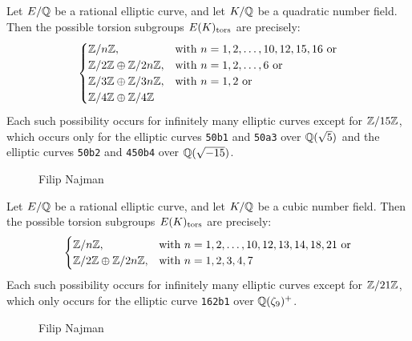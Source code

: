 \begin{frame}[plain]
\footnotesize
\begin{thm}[Najman, 2015]
Let $E/\mathbb{Q}$ be a rational elliptic curve, and let $K/\mathbb{Q}$ be a quadratic number field. Then the possible torsion subgroups $E(K)_{\text{tors}}$ are precisely:
	\[
	\begin{cases}
	\mathbb{Z}/n\mathbb{Z}, & \text{with } n= 1, 2, \ldots, 10, 12, 15, 16 \text{ or} \\
	\mathbb{Z}/2\mathbb{Z} \oplus \mathbb{Z}/2n\mathbb{Z}, & \text{with } n= 1, 2, \ldots, 6 \text{ or} \\
	\mathbb{Z}/3\mathbb{Z} \oplus \mathbb{Z}/3n\mathbb{Z}, & \text{with } n= 1, 2 \text{ or} \\
	\mathbb{Z}/4\mathbb{Z} \oplus \mathbb{Z}/4\mathbb{Z}
	\end{cases}
	\]
Each such possibility occurs for infinitely many elliptic curves except for $\mathbb{Z}/15\mathbb{Z}$, which occurs only for the elliptic curves \texttt{50b1} and \texttt{50a3} over $\mathbb{Q}(\sqrt{5})$ and the elliptic curves \texttt{50b2} and \texttt{450b4} over $\mathbb{Q}(\sqrt{-15})$. 
\end{thm}
	\begin{figure}[!ht]
	\centering
	\captionsetup{labelformat=empty}
	\caption{Filip Najman}
	\end{figure}
\end{frame}



\begin{frame}[plain]
\begin{thm}[Najman, 2015]
Let $E/\mathbb{Q}$ be a rational elliptic curve, and let $K/\mathbb{Q}$ be a cubic number field. Then the possible torsion subgroups $E(K)_{\text{tors}}$ are precisely:
	\[
	\begin{cases}
	\mathbb{Z}/n\mathbb{Z}, & \text{with } n= 1, 2, \ldots, 10, 12, 13, 14, 18, 21 \text{ or} \\
	\mathbb{Z}/2\mathbb{Z} \oplus \mathbb{Z}/2n\mathbb{Z}, & \text{with } n= 1, 2, 3, 4, 7
	\end{cases}
	\]
Each such possibility occurs for infinitely many elliptic curves except for $\mathbb{Z}/21\mathbb{Z}$, which only occurs for the elliptic curve \texttt{162b1} over $\mathbb{Q}(\zeta_9)^+$.
\end{thm}
	\begin{figure}[!ht]
	\centering
	\captionsetup{labelformat=empty}
	\caption{Filip Najman}
	\end{figure}
\end{frame}



